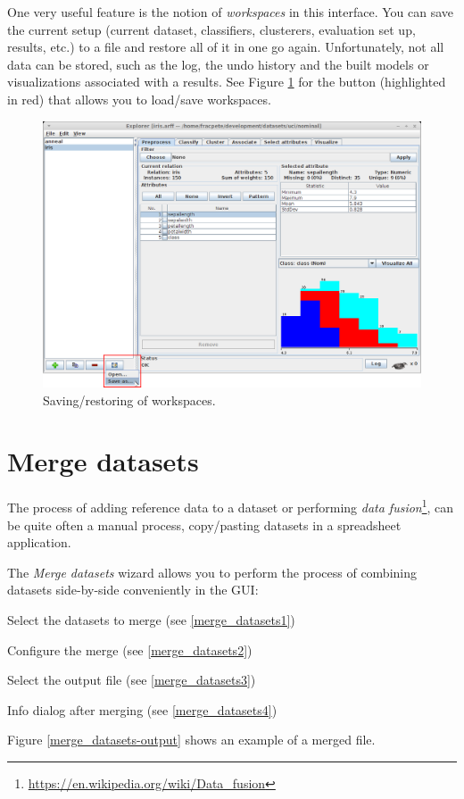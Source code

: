 One very useful feature is the notion of \textit{workspaces} in this interface.
You can save the current setup (current dataset, classifiers, clusterers,
evaluation set up, results, etc.) to a file and restore all of it in one go
again. Unfortunately, not all data can be stored, such as the log, the undo
history and the built models or visualizations associated with a results.
See Figure \ref{explorerext-workspaces} for the button (highlighted in red)
that allows you to load/save workspaces.

\begin{figure}[htb]
  \centering
  \includegraphics[width=12.0cm]{images/explorerext-workspaces.png}
  \caption{Saving/restoring of workspaces.}
  \label{explorerext-workspaces}
\end{figure}

\clearpage
\section{Merge datasets}
The process of adding reference data to a dataset or performing
\textit{data fusion}\footnote{\url{https://en.wikipedia.org/wiki/Data_fusion}{}},
can be quite often a manual process, copy/pasting datasets in a spreadsheet
application.

The \textit{Merge datasets} wizard allows you to perform the
process of combining datasets side-by-side conveniently in the GUI:
\begin{tight_itemize}
  \item Select the datasets to merge (see \ref{merge_datasets1})
  \item Configure the merge (see \ref{merge_datasets2})
  \item Select the output file (see \ref{merge_datasets3})
  \item Info dialog after merging (see \ref{merge_datasets4})
\end{tight_itemize}
Figure \ref{merge_datasets-output} shows an example of a merged file.

